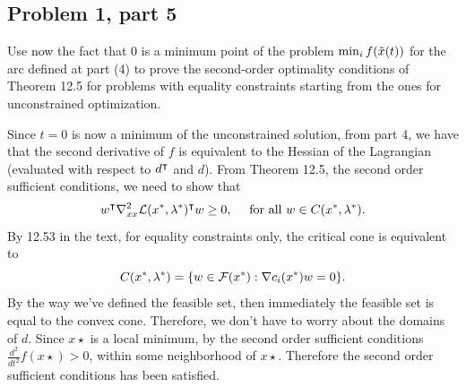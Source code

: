\newpage
\subsection{Problem 1, part 5}
Use now the fact that 0 is a minimum point of the problem $\min_{i} f(\Tilde{x}(t))$ for the arc defined at part (4) to prove the second-order optimality conditions of Theorem 12.5 for problems with equality constraints starting from the ones for unconstrained optimization.
\partbreak
\begin{solution}

    Since $t = 0$ is now a minimum of the unconstrained solution, from part 4, we have that the second derivative of $f$ is equivalent to the Hessian of the Lagrangian (evaluated with respect to $d^{\intercal}$ and $d$). From Theorem 12.5, the second order sufficient conditions, we need to show that 
    \[w^{\intercal} \nabla^2_{xx}\mathcal{L} (x^{*}, \mathrm{\lambda}^{*})^{\intercal} w \geq 0, \quad \text{ for all } w \in C(x^{*}, \mathrm{\lambda}^{*}).\]
    By 12.53 in the text, for equality constraints only, the critical cone is equivalent to 
    \[C(x^{*}, \mathrm{\lambda}^{*}) = \{ w \in \mathcal{F}(x^{*}) : \nabla c_i(x^{*})w = 0\}.\]
    By the way we've defined the feasible set, then immediately the feasible set is equal to the convex cone. Therefore, we don't have to worry about the domains of $d$. Since $x\star$ is a local minimum, by the second order sufficient conditions $\frac{d^2}{dt^2}f(x\star) > 0$, within some neighborhood of $x\star$. Therefore the second order sufficient conditions has been satisfied. 
\end{solution}

\newpage
